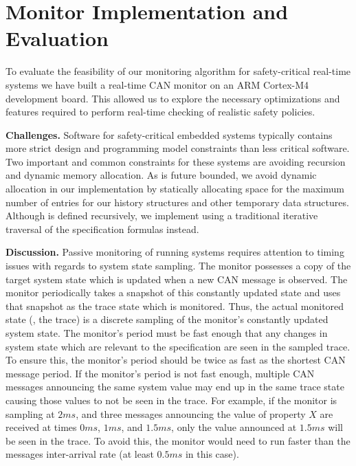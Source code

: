 
\section{Monitor Implementation and Evaluation}
\label{sec:implementation}

To evaluate the feasibility of our monitoring algorithm for safety-critical
real-time systems we have built a real-time CAN monitor on an ARM Cortex-M4
development board. This allowed us to explore the necessary optimizations and
features required to perform real-time checking of realistic safety policies.


\noindent\textbf{Challenges. }
Software for safety-critical embedded systems typically contains more strict
design and programming model constraints than less critical software. Two
important and common constraints for these systems are avoiding recursion  and
 dynamic memory allocation.
As \planguage is future bounded, we avoid dynamic allocation
in our \monitor implementation by statically allocating space for the maximum
number of entries for our history structures and other temporary data structures.
Although \monitor is defined recursively,
we  implement \monitor using a traditional iterative traversal
of the specification formulas instead.

\noindent\textbf{Discussion. }
Passive monitoring of running systems requires attention to timing issues with regards to system state sampling.
%
The monitor possesses a copy of the target system state
which is updated when a new CAN message is observed.
The monitor periodically takes a snapshot of this constantly updated state and uses that snapshot as the trace state which is monitored.
%
Thus, the actual monitored state (\ie, the trace) is a discrete sampling of the monitor's constantly updated system state.
The monitor's period must be fast enough that any changes in system state which are relevant to the specification are seen in the sampled trace.
To ensure this, the monitor's period should be twice as fast as the shortest CAN message period.
If the monitor's period is not fast enough, multiple CAN messages announcing the same system value may end up in the same trace state causing those values to not be seen in the trace.
For example, if the monitor is sampling at $2ms$, and three messages announcing the value of property $X$ are received at times $0ms$, $1ms$, and $1.5ms$, only the value announced at $1.5ms$ will be seen in the trace. To avoid this, the monitor would need to run faster than the messages inter-arrival rate (at least $0.5ms$ in this case).

